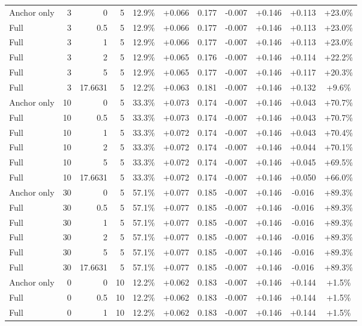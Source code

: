 \begin{table}[htbp]
\begin{tabular}{lrrrccccccc}
Anchor only & 3 & 0 & 5 & 12.9\% & +0.066 & 0.177 & -0.007 & +0.146 & +0.113 & +23.0\% \\
Full & 3 & 0.5 & 5 & 12.9\% & +0.066 & 0.177 & -0.007 & +0.146 & +0.113 & +23.0\% \\
Full & 3 & 1 & 5 & 12.9\% & +0.066 & 0.177 & -0.007 & +0.146 & +0.113 & +23.0\% \\
Full & 3 & 2 & 5 & 12.9\% & +0.065 & 0.176 & -0.007 & +0.146 & +0.114 & +22.2\% \\
Full & 3 & 5 & 5 & 12.9\% & +0.065 & 0.177 & -0.007 & +0.146 & +0.117 & +20.3\% \\
Full & 3 & 17.6631 & 5 & 12.2\% & +0.063 & 0.181 & -0.007 & +0.146 & +0.132 & +9.6\% \\
Anchor only & 10 & 0 & 5 & 33.3\% & +0.073 & 0.174 & -0.007 & +0.146 & +0.043 & +70.7\% \\
Full & 10 & 0.5 & 5 & 33.3\% & +0.073 & 0.174 & -0.007 & +0.146 & +0.043 & +70.7\% \\
Full & 10 & 1 & 5 & 33.3\% & +0.072 & 0.174 & -0.007 & +0.146 & +0.043 & +70.4\% \\
Full & 10 & 2 & 5 & 33.3\% & +0.072 & 0.174 & -0.007 & +0.146 & +0.044 & +70.1\% \\
Full & 10 & 5 & 5 & 33.3\% & +0.072 & 0.174 & -0.007 & +0.146 & +0.045 & +69.5\% \\
Full & 10 & 17.6631 & 5 & 33.3\% & +0.072 & 0.174 & -0.007 & +0.146 & +0.050 & +66.0\% \\
Anchor only & 30 & 0 & 5 & 57.1\% & +0.077 & 0.185 & -0.007 & +0.146 & -0.016 & +89.3\% \\
Full & 30 & 0.5 & 5 & 57.1\% & +0.077 & 0.185 & -0.007 & +0.146 & -0.016 & +89.3\% \\
Full & 30 & 1 & 5 & 57.1\% & +0.077 & 0.185 & -0.007 & +0.146 & -0.016 & +89.3\% \\
Full & 30 & 2 & 5 & 57.1\% & +0.077 & 0.185 & -0.007 & +0.146 & -0.016 & +89.3\% \\
Full & 30 & 5 & 5 & 57.1\% & +0.077 & 0.185 & -0.007 & +0.146 & -0.016 & +89.3\% \\
Full & 30 & 17.6631 & 5 & 57.1\% & +0.077 & 0.185 & -0.007 & +0.146 & -0.016 & +89.3\% \\
Anchor only & 0 & 0 & 10 & 12.2\% & +0.062 & 0.183 & -0.007 & +0.146 & +0.144 & +1.5\% \\
Full & 0 & 0.5 & 10 & 12.2\% & +0.062 & 0.183 & -0.007 & +0.146 & +0.144 & +1.5\% \\
Full & 0 & 1 & 10 & 12.2\% & +0.062 & 0.183 & -0.007 & +0.146 & +0.144 & +1.5\% \\

\end{tabular}
\end{table}
